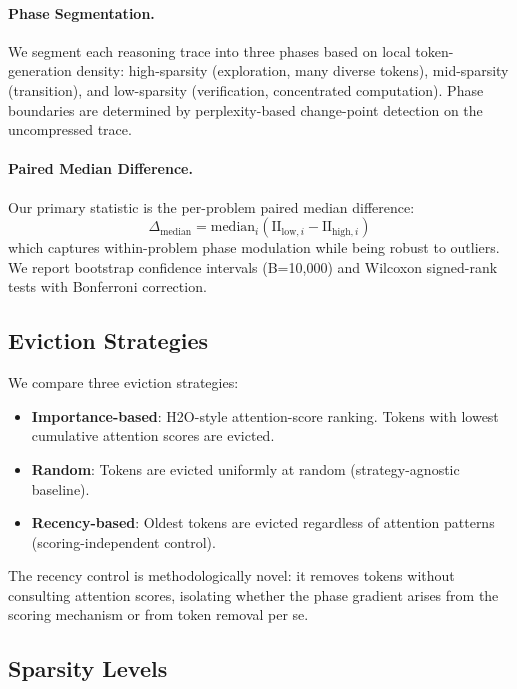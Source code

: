 \documentclass[11pt,a4paper]{article}
\begin{document}
\paragraph{Phase Segmentation.}
We segment each reasoning trace into three phases based on local token-generation density: high-sparsity (exploration, many diverse tokens), mid-sparsity (transition), and low-sparsity (verification, concentrated computation). Phase boundaries are determined by perplexity-based change-point detection on the uncompressed trace.

\paragraph{Paired Median Difference.}
Our primary statistic is the per-problem paired median difference:
\begin{equation}
    \Delta_{\text{median}} = \text{median}_i(\text{II}_{\text{low},i} - \text{II}_{\text{high},i})
\end{equation}
which captures within-problem phase modulation while being robust to outliers. We report bootstrap confidence intervals (B=10,000) and Wilcoxon signed-rank tests with Bonferroni correction.

\subsection{Eviction Strategies}

We compare three eviction strategies:
\begin{itemize}
    \item \textbf{Importance-based}: H2O-style attention-score ranking. Tokens with lowest cumulative attention scores are evicted.
    \item \textbf{Random}: Tokens are evicted uniformly at random (strategy-agnostic baseline).
    \item \textbf{Recency-based}: Oldest tokens are evicted regardless of attention patterns (scoring-independent control).
\end{itemize}

The recency control is methodologically novel: it removes tokens without consulting attention scores, isolating whether the phase gradient arises from the scoring mechanism or from token removal per se.

\subsection{Sparsity Levels}
\end{document}
